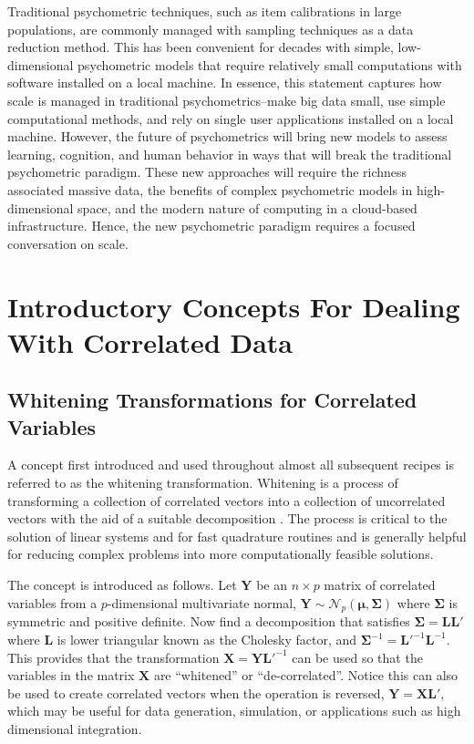 \documentclass[12pt]{article}
\begin{document}
Traditional psychometric techniques, such as item calibrations in large populations, are commonly managed with sampling techniques as a data reduction method. This has been convenient for decades with simple, low-dimensional psychometric models that require relatively small computations with software installed on a local machine. In essence, this statement captures how scale is managed in traditional psychometrics--make big data small, use simple computational methods, and rely on single user applications installed on a local machine. However, the future of psychometrics will bring new models to assess learning, cognition, and human behavior in ways that will break the traditional psychometric paradigm. These new approaches will require the richness associated massive data, the benefits of complex psychometric models in high-dimensional space, and the modern nature of computing in a cloud-based infrastructure.  Hence, the new psychometric paradigm requires a focused conversation on scale. 

\section*{Introductory Concepts For Dealing With Correlated Data}

\subsection*{Whitening Transformations for Correlated Variables}

A concept first introduced and used throughout almost all subsequent recipes is referred to as the whitening transformation. Whitening is a process of transforming a collection of correlated vectors into a collection of uncorrelated vectors with the aid of a suitable decomposition \cite{whiten}. The process is critical to the solution of linear systems and for fast quadrature routines and is generally helpful for reducing complex problems into more computationally feasible solutions. 

The concept is introduced as follows. Let $\bm{Y}$ be an $n \times p$ matrix of correlated variables from a $p$-dimensional multivariate normal, $\bm{Y} \sim \mathcal{N}_p(\bm{\mu}, \bm{\Sigma})$ where $\bm{\Sigma}$ is symmetric and positive definite. Now find a decomposition that satisfies $\bm{\Sigma} = \bm{L}\bm{L}'$ where $\bm{L}$ is lower triangular known as the Cholesky factor, and $\bm{\Sigma}^{-1} = \bm{L'}^{-1}\bm{L}^{-1}$. This provides that the transformation $\bm{X} = \bm{Y}\bm{L}'^{-1}$ can be used so that the variables in the matrix $\bm{X}$ are ``whitened'' or ``de-correlated''. Notice this can also be used to create correlated vectors when the operation is reversed, $\bm{Y}= \bm{X}\bm{L}'$, which may be useful for data generation, simulation, or applications such as high dimensional integration. 
\end{document}
